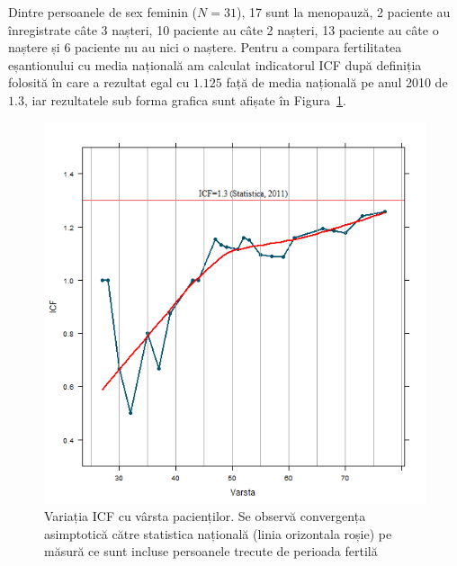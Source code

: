 \documentclass[12pt,draft]{article}
\begin{document}
  Dintre persoanele de sex feminin ($N=31$), 17 sunt la menopauză, 2 paciente au înregistrate câte 3 nașteri, 10 paciente au câte 2 nașteri, 13 paciente au câte o naștere și 6 paciente nu au nici o naștere. Pentru a compara fertilitatea eșantionului cu media națională am calculat indicatorul \ac{ICF} după definiția folosită în \citep{insee2011} care a rezultat egal cu $1.125$ față de media națională pe anul 2010 de $1.3$, iar rezultatele sub forma grafica sunt afișate în Figura~\ref{fig:incoNasteriICF}.
  \begin{figure}[H]
    \centering
    \includegraphics[width=0.8\linewidth]{incoNasteriICF}
    \caption{Variația ICF cu vârsta pacienților. Se observă convergența asimptotică către statistica națională (linia orizontala roșie) pe măsură ce sunt incluse persoanele trecute de perioada fertilă }
    \label{fig:incoNasteriICF}
  \end{figure}
  
\end{document}
